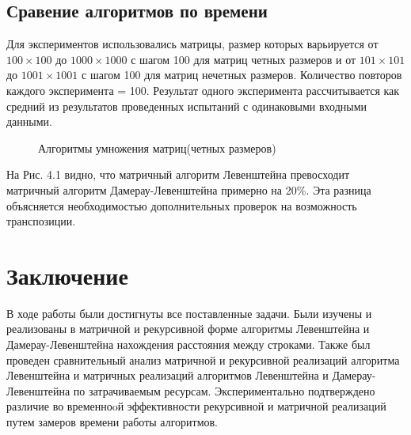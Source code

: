 \documentclass[a4paper,12pt]{report}
\begin{document}
\section{Сравение алгоритмов по времени}
\hspace{0.6cm}Для экспериментов использовались матрицы, размер которых варьируется от $100 \times 100$ до $1000 \times 1000$ с шагом 100 для матриц четных размеров и от $101 \times 101$ до $1001 \times 1001$ с шагом 100 для матриц нечетных размеров. 
    Количество повторов каждого эксперимента = 100. Результат одного эксперимента рассчитывается как средний из результатов проведенных испытаний с одинаковыми входными данными.
    

\begin{figure}[ht!]
\begin{center}
\caption{Алгоритмы умножения матриц(четных размеров)}
\end{center}
\end{figure}

На Рис. 4.1 видно, что матричный алгоритм Левенштейна превосходит матричный алгоритм Дамерау-Левенштейна примерно на 20\%. Эта разница объясняется необходимостью дополнительных проверок на возможность транспозиции.



\chapter*{Заключение}
\hspace{0.6cm}В ходе работы были достигнуты все поставленные задачи. Были изучены и реализованы в матричной и рекурсивной форме алгоритмы Левенштейна и Дамерау-Левенштейна нахождения расстояния между строками. Также был проведен сравнительный анализ матричной и рекурсивной реализаций алгоритма Левенштейна и матричных реализаций алгоритмов Левенштейна и Дамерау-Левенштейна по затрачиваемым ресурсам. Экспериментально подтверждено различие во временноoй эффективности рекурсивной и матричной реализаций путем замеров времени работы алгоритмов.
    
\end{document}
